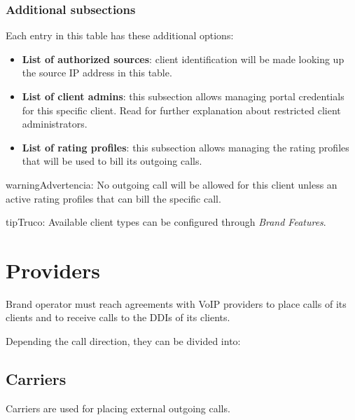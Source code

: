 \documentclass[letterpaper,10pt,spanish]{sphinxmanual}
\begin{document}
\subsubsection{Additional subsections}
\label{administration_portal/brand/clients/wholesale:additional-subsections}
Each entry in this table has these additional options:
\begin{itemize}
\item {} 
\textbf{List of authorized sources}: client identification will be made looking up the source IP address in this table.

\item {} 
\textbf{List of client admins}: this subsection allows managing portal credentials for this specific client. Read {\hyperref[api_rest/acls:acls]{}}
for further explanation about restricted client administrators.

\item {} 
\textbf{List of rating profiles}: this subsection allows managing the rating profiles that will be used to bill its outgoing calls.

\end{itemize}

\begin{notice}{warning}{Advertencia:}
No outgoing call will be allowed for this client unless an active rating profiles that can
bill the specific call.
\end{notice}

\begin{notice}{tip}{Truco:}
Available client types can be configured through \emph{Brand Features}.
\end{notice}


\section{Providers}
\label{administration_portal/brand/providers/index::doc}\label{administration_portal/brand/providers/index:providers}
Brand operator must reach agreements with VoIP providers to place calls of its clients and to receive calls to the
DDIs of its clients.

Depending the call direction, they can be divided into:


\subsection{Carriers}
\label{administration_portal/brand/providers/carriers:id1}\label{administration_portal/brand/providers/carriers::doc}\label{administration_portal/brand/providers/carriers:carriers}
Carriers are used for placing external outgoing calls.
\end{document}
